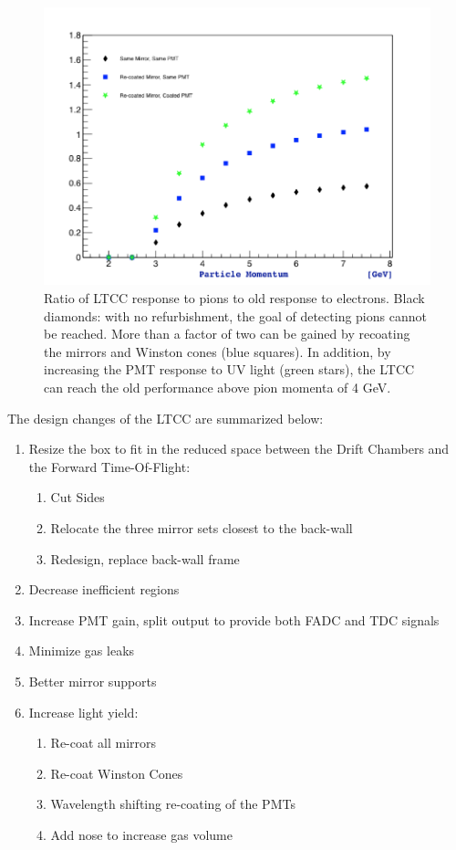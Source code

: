 \begin{figure}
	\centering
	\includegraphics[width=0.95\columnwidth,keepaspectratio]{img/refurbishmentGains.png}
	\caption{Ratio of LTCC response to pions to old response to electrons. Black diamonds: with no refurbishment, the goal of detecting pions cannot be reached.
            More than a factor of two can be gained by recoating the mirrors and Winston cones (blue squares). In addition, by increasing the
            PMT response to UV light (green stars), the LTCC can reach the old performance above pion momenta of 4 GeV.}
	\label{fig:refurbishmentGains}
\end{figure}

The design changes of the LTCC are summarized below:

\begin{enumerate}
\item Resize the box to fit in the reduced space between the Drift Chambers and the Forward Time-Of-Flight:
	\begin{enumerate}
		\item Cut Sides
		\item Relocate the three mirror sets closest to the back-wall
		\item Redesign, replace back-wall frame
	\end{enumerate}

	\item Decrease inefficient regions
	\item Increase PMT gain, split output to provide both FADC and TDC signals
	\item Minimize gas leaks
	\item Better mirror supports
	\item Increase light yield:
	\begin{enumerate}
		\item Re-coat all mirrors
		\item Re-coat Winston Cones
		\item Wavelength shifting re-coating of the PMTs
		\item Add nose to increase gas volume
	\end{enumerate}
\end{enumerate}










